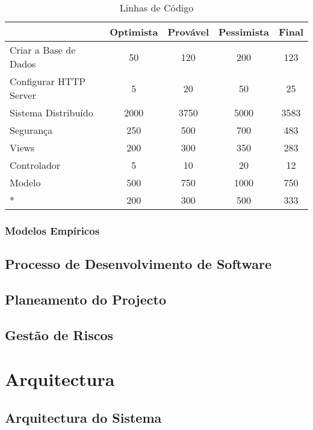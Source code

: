 \documentclass[12pt, a4paper, twoside]{report} %
\begin{document}
\begin{table}[h]
\centering
\begin{tabular}{|l|c|c|c|c|}
\hline
                       & Optimista & Provável & Pessimista & Final \\ \hline
Criar a Base de Dados  & 50        & 120      & 200        & 123   \\ \hline
Configurar HTTP Server & 5         & 20       & 50         & 25    \\ \hline
Sistema Distribuído    & 2000      & 3750     & 5000       & 3583  \\ \hline
Segurança              & 250       & 500      & 700        & 483   \\ \hline
Views                  & 200       & 300      & 350        & 283   \\ \hline
Controlador 		   & 5         & 10       & 20         & 12    \\ \hline
Modelo                 & 500       & 750      & 1000       & 750   \\ \hline
*                      & 200       & 300      & 500        & 333   \\ \hline
\end{tabular}
\caption{Linhas de Código}
\label{codigo}
\end{table}

\subsection{Modelos Empíricos}

\section{Processo de Desenvolvimento de Software}

\section{Planeamento do Projecto}

\section{Gestão de Riscos}

\chapter{Arquitectura}

\section{Arquitectura do Sistema}
\end{document}
